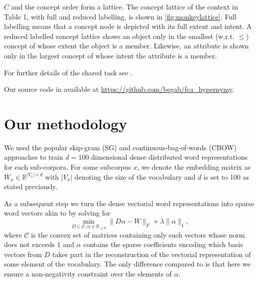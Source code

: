 \documentclass[11pt,a4paper]{article}
\begin{document}
$C$ and the concept order form a %
lattice.  The concept lattice of the context in Table 1, with full and reduced
labelling, is shown in \ref{fig:monkeylattice}.
Full labelling means that a concept node is depicted with its full extent and
intent. A reduced labelled concept lattice shows an object only in the smallest
(w.r.t. $\le$) concept of whose extent the object is a member.
Likewise, an attribute is shown only in the largest concept of whose intent the
attribute is a member.%

For further details of the shared task see
\cite{semeval2018task9}.

Our source code in available at \url{https://github.com/begab/fca_hypernymy}.


\section{Our methodology}
We used the popular skip-gram (SG) and continuous-bag-of-words (CBOW) approaches \cite{Mikolov:2013f} to train $d=100$ dimensional dense distributed word representations for each sub-corpora. For some subcorpus $x$, we denote the embedding matrix as $W_x \in \mathbb{R}^{\lvert V_x \rvert \times d}$ with $\lvert V_x \rvert$ denoting the size of the vocabulary and $d$ is set to 100 as stated previously.

As a subsequent step we turn the dense vectorial word representations into sparse word vectors akin to \citet{TACL1063} by solving for
\begin{equation}
\min\limits_{D \in \mathcal{C}, \alpha \in \mathbb{R}_{\geq0}} \lVert D\alpha - W \rVert_F + \lambda \lVert \alpha \rVert_1,
\label{nonneg_SPAMS_objective}
\end{equation}
where $\mathcal{C}$ is the convex set of matrices containing only such vectors whose norm does not exceeds $1$ and $\alpha$ contains the sparse coefficients encoding which basis vectors from $D$ takes part in the reconstruction of the vectorial representation of some element of the vocabulary. The only difference compared to \cite{TACL1063} is that here we ensure a non-negativity constraint over the elements of $\alpha$.
\end{document}
